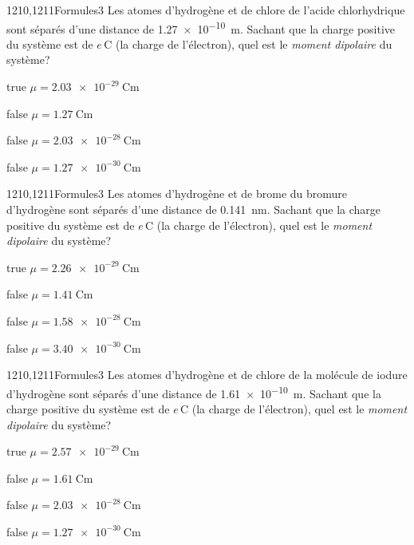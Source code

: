 \documentclass[11pt]{article}
\begin{document}
        \begin{question}{1210,1211}{Formules}{3}{}
            Les atomes d'hydrogène et de chlore de l'acide chlorhydrique sont séparés d'une distance de \SI{1.27e-10}{\meter}. Sachant que la charge positive du système est de $e\,\si{\coulomb}$ (la charge de l'électron), quel est le \emph{moment dipolaire} du système?
        \end{question}
        \begin{reponses}
    	    \item[true] $\mu = \SI{2.03e-29}{\coulomb\meter}$
    	    \item[false] $\mu = \SI{1.27}{\coulomb\meter}$
    	    \item[false] $\mu = \SI{2.03e-28}{\coulomb\meter}$
    	    \item[false] $\mu = \SI{1.27e-30}{\coulomb\meter}$
        \end{reponses}
        
        \begin{question}{1210,1211}{Formules}{3}{}
            Les atomes d'hydrogène et de brome du bromure d'hydrogène sont séparés d'une distance de \SI{0.141}{\nano\meter}. Sachant que la charge positive du système est de $e\,\si{\coulomb}$ (la charge de l'électron), quel est le \emph{moment dipolaire} du système?
        \end{question}
        \begin{reponses}
    	    \item[true] $\mu = \SI{2.26e-29}{\coulomb\meter}$
    	    \item[false] $\mu = \SI{1.41}{\coulomb\meter}$
    	    \item[false] $\mu = \SI{1.58e-28}{\coulomb\meter}$
    	    \item[false] $\mu = \SI{3.40e-30}{\coulomb\meter}$
        \end{reponses}
        
        \begin{question}{1210,1211}{Formules}{3}{}
			Les atomes d'hydrogène et de chlore de la molécule de iodure d'hydrogène sont séparés d'une distance de \SI{1.61e-10}{\meter}. Sachant que la charge positive du système est de $e\,\si{\coulomb}$ (la charge de l'électron), quel est le \emph{moment dipolaire} du système?
        \end{question}
        \begin{reponses}
    	    \item[true] $\mu = \SI{2.57e-29}{\coulomb\meter}$
    	    \item[false] $\mu = \SI{1.61}{\coulomb\meter}$
    	    \item[false] $\mu = \SI{2.03e-28}{\coulomb\meter}$
    	    \item[false] $\mu = \SI{1.27e-30}{\coulomb\meter}$
        \end{reponses}
        
\end{document}
